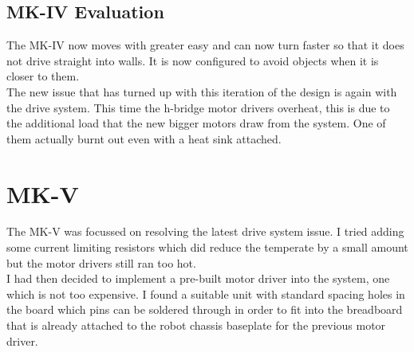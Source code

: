 \subsection{MK-IV Evaluation}
The MK-IV now moves with greater easy and can now turn faster so that it does not drive straight into walls.  It is now configured to avoid objects when it is closer to them.
\\The new issue that has turned up with this iteration of the design is again with the drive system.  This time the h-bridge motor drivers overheat, this is due to the additional load that the new bigger motors draw from the system.  One of them actually burnt out even with a heat sink attached.
\section{MK-V}
The MK-V was focussed on resolving the latest drive system issue.  I tried adding some current limiting resistors which did reduce the temperate by a small amount but the motor drivers still ran too hot.
\\I had then decided to implement a pre-built motor driver into the system, one which is not too expensive.  I found a suitable unit with standard spacing holes in the board which pins can be soldered through in order to fit into the breadboard that is already attached to the robot chassis baseplate for the previous motor driver.
